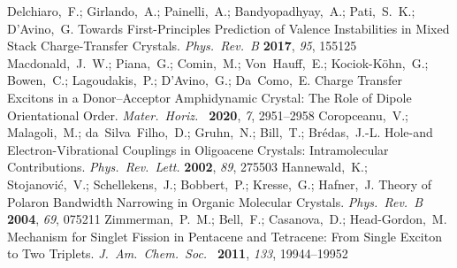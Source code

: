 \documentclass[journal=jpclcd,manuscript=letter]{achemso}
\begin{document}
\begin{mcitethebibliography}{51}
Delchiaro,~F.; Girlando,~A.; Painelli,~A.; Bandyopadhyay,~A.; Pati,~S.~K.;
  D'Avino,~G. Towards First-Principles Prediction of Valence Instabilities in
  Mixed Stack Charge-Transfer Crystals. \emph{Phys.~Rev.~B} \textbf{2017},
  \emph{95}, 155125\relax
\mciteBstWouldAddEndPuncttrue
\mciteSetBstMidEndSepPunct{\mcitedefaultmidpunct}
{\mcitedefaultendpunct}{\mcitedefaultseppunct}\relax
\EndOfBibitem
{}
Macdonald,~J.~W.; Piana,~G.; Comin,~M.; Von~Hauff,~E.; Kociok-K{\"o}hn,~G.;
  Bowen,~C.; Lagoudakis,~P.; D'Avino,~G.; Da~Como,~E. Charge Transfer Excitons
  in a Donor--Acceptor Amphidynamic Crystal: The Role of Dipole Orientational
  Order. \emph{Mater.~Horiz.~} \textbf{2020}, \emph{7}, 2951--2958\relax
\mciteBstWouldAddEndPuncttrue
\mciteSetBstMidEndSepPunct{\mcitedefaultmidpunct}
{\mcitedefaultendpunct}{\mcitedefaultseppunct}\relax
\EndOfBibitem
{}
Coropceanu,~V.; Malagoli,~M.; da~Silva~Filho,~D.; Gruhn,~N.; Bill,~T.;
  Br{\'e}das,~J.-L. Hole-and Electron-Vibrational Couplings in Oligoacene
  Crystals: Intramolecular Contributions. \emph{Phys.~Rev.~Lett.}
  \textbf{2002}, \emph{89}, 275503\relax
\mciteBstWouldAddEndPuncttrue
\mciteSetBstMidEndSepPunct{\mcitedefaultmidpunct}
{\mcitedefaultendpunct}{\mcitedefaultseppunct}\relax
\EndOfBibitem
{}
Hannewald,~K.; Stojanovi{\'c},~V.; Schellekens,~J.; Bobbert,~P.; Kresse,~G.;
  Hafner,~J. Theory of Polaron Bandwidth Narrowing in Organic Molecular
  Crystals. \emph{Phys.~Rev.~B} \textbf{2004}, \emph{69}, 075211\relax
\mciteBstWouldAddEndPuncttrue
\mciteSetBstMidEndSepPunct{\mcitedefaultmidpunct}
{\mcitedefaultendpunct}{\mcitedefaultseppunct}\relax
\EndOfBibitem
{}
Zimmerman,~P.~M.; Bell,~F.; Casanova,~D.; Head-Gordon,~M. Mechanism for Singlet
  Fission in Pentacene and Tetracene: From Single Exciton to Two Triplets.
  \emph{J.~Am.~Chem.~Soc.~} \textbf{2011}, \emph{133}, 19944--19952\relax
\mciteBstWouldAddEndPuncttrue
\mciteSetBstMidEndSepPunct{\mcitedefaultmidpunct}
{\mcitedefaultendpunct}{\mcitedefaultseppunct}\relax
\EndOfBibitem
{}

\end{mcitethebibliography}
\end{document}
